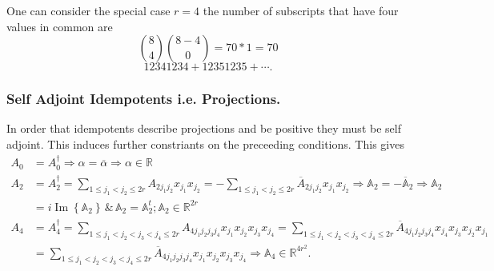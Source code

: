 \documentclass[aps, preprint]{revtex4}
\begin{document}
One can consider the special case $r =4$ the number of subscripts that have four values in common are
\begin{equation}\binom{8}{4} \binom{8 -4}{0} =70 \ast 1 =70
\end{equation}
\begin{equation}12341234 +12351235 +\cdots \text{.}
\end{equation}

\subsubsection{Self Adjoint Idempotents i.e. Projections.}
In order that idempotents describe projections and be positive they must be self adjoint. This induces further constriants on the preceeding
conditions. This gives
\begin{align}A_{0} &  =A_{0}^{ \dag } \Rightarrow \alpha  =\overline{\alpha } \Rightarrow \alpha  \in \mathbb{R} \\
A_{2} &  =A_{2}^{ \dag } =\sum _{1 \leq j_{1} <j_{2} \leq 2 r}A_{2 j_{1} j_{2}} x_{j_{1}} x_{j_{2}} = -\sum _{1 \leq j_{1} <j_{2} \leq 2 r}\overline{A}_{2 j_{1} j_{2}} x_{j_{1}} x_{j_{2}} \Rightarrow \mathbb{A}_{2} = -\overline{\mathbb{A}}_{2} \Rightarrow \mathbb{A}_{2} \\
 &  =i \ensuremath{\operatorname*{Im}} \left \{\mathbb{A}_{2}\right \}\, \&\,\mathbb{A}_{2} =\mathbb{A}_{2}^{t} ;\mathbb{A}_{2} \in \mathbb{R}^{2 r} \\
A_{4} &  =A_{4}^{ \dag } =\sum _{1 \leq j_{1} <j_{2} <j_{3} <j_{4} \leq 2 r}A_{4 j_{1} j_{2} j_{3} j_{4}} x_{j_{1}} x_{j_{2}} x_{j_{3}} x_{j_{4}} =\sum _{1 \leq j_{1} <j_{2} <j_{3} <j_{4} \leq 2 r}\overline{A}_{4 j_{1} j_{2} j_{3} j_{4}} x_{j_{4}} x_{j_{3}} x_{j_{2}} x_{j_{1}} \\
 &  =\sum _{1 \leq j_{1} <j_{2} <j_{3} <j_{4} \leq 2 r}\overline{A}_{4 j_{1} j_{2} j_{3} j_{4}} x_{j_{1}} x_{j_{2}} x_{j_{3}} x_{j_{4}} \Rightarrow \mathbb{A}_{4} \in \mathbb{R}^{4 r^{2}}\text{.}\end{align}
\end{document}
